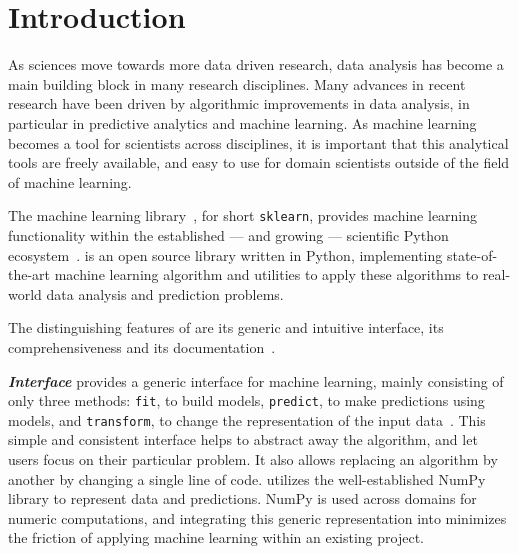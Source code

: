 




\setcounter{section}{0}
\section{Introduction}
As sciences move towards more data driven research, data analysis has
become a main building block in many research disciplines.
Many advances in recent research have been driven by algorithmic improvements
in data analysis, in particular in predictive analytics and machine learning.
As machine learning becomes a tool for scientists across disciplines, it is
important that this analytical tools are freely available, and easy to use for
domain scientists outside of the field of machine learning.


The \sklearn{} machine learning library~\autocite{pedregosa2011scikit}, for
short \texttt{sklearn}, provides machine learning functionality
within the established --- and growing --- scientific Python
ecosystem~\autocite{benlorica, infoworld}.  \sklearn{} is an open source
library written in Python, implementing state-of-the-art machine learning
algorithm and utilities to apply these algorithms to real-world data analysis
and prediction problems.

The distinguishing features of \sklearn{} are its generic and intuitive
interface, its comprehensiveness and its documentation~\autocite{Varoquaux_2015, benlorica}.

\emph{\textbf{Interface}} \sklearn{} provides a generic interface for machine learning, mainly consisting
of only three methods: \texttt{fit}, to build models, \texttt{predict}, to make predictions using models,
and \texttt{transform}, to change the representation of the input data~\autocite{buitinck2013api}.
This simple and consistent interface helps to abstract away the algorithm, and let
users focus on their particular problem. It also allows replacing an algorithm by another
by changing a single line of code.
\sklearn{} utilizes the well-established NumPy library to represent data and predictions.
NumPy is used across domains for numeric computations, and integrating this generic
representation into \sklearn{} minimizes the friction of applying machine learning
within an existing project.

